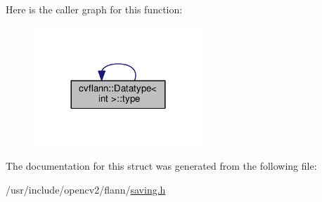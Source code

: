 Here is the caller graph for this function\-:\nopagebreak
\begin{figure}[H]
\begin{center}
\leavevmode
\includegraphics[width=180pt]{structcvflann_1_1Datatype_3_01int_01_4_ada70f4b6173d0644fc297d25c8937a8a_icgraph}
\end{center}
\end{figure}




The documentation for this struct was generated from the following file\-:\begin{DoxyCompactItemize}
\item 
/usr/include/opencv2/flann/\hyperlink{saving_8h}{saving.\-h}\end{DoxyCompactItemize}
